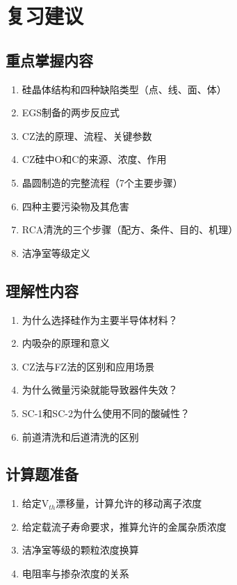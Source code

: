 \documentclass[UTF8,12pt,a4paper]{ctexart}
\begin{document}
\section{复习建议}

\subsection{重点掌握内容}

\begin{enumerate}
    \item 硅晶体结构和四种缺陷类型（点、线、面、体）
    \item EGS制备的两步反应式
    \item CZ法的原理、流程、关键参数
    \item CZ硅中O和C的来源、浓度、作用
    \item 晶圆制造的完整流程（7个主要步骤）
    \item 四种主要污染物及其危害
    \item RCA清洗的三个步骤（配方、条件、目的、机理）
    \item 洁净室等级定义
\end{enumerate}

\subsection{理解性内容}

\begin{enumerate}
    \item 为什么选择硅作为主要半导体材料？
    \item 内吸杂的原理和意义
    \item CZ法与FZ法的区别和应用场景
    \item 为什么微量污染就能导致器件失效？
    \item SC-1和SC-2为什么使用不同的酸碱性？
    \item 前道清洗和后道清洗的区别
\end{enumerate}

\subsection{计算题准备}

\begin{enumerate}
    \item 给定V$_{th}$漂移量，计算允许的移动离子浓度
    \item 给定载流子寿命要求，推算允许的金属杂质浓度
    \item 洁净室等级的颗粒浓度换算
    \item 电阻率与掺杂浓度的关系
\end{enumerate}
\end{document}

